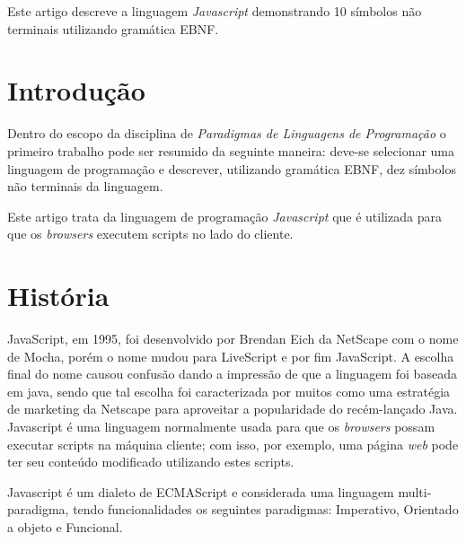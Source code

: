 \documentclass[
	article,			%
	11pt,				%
	oneside,			%
	a4paper,			%
	english,			%
	brazil,				%
	]{abntex2}
\begin{document}
\frenchspacing 

\maketitle

\begin{resumoumacoluna}
    
    Este artigo descreve a linguagem \emph{Javascript} demonstrando 10 símbolos
    não terminais utilizando gramática EBNF. 

 \vspace{\onelineskip}
 
 \noindent
\end{resumoumacoluna}

\textual

    \section*{Introdução}

        Dentro do escopo da disciplina de \emph{Paradigmas de Linguagens de Programação} o primeiro trabalho pode ser resumido da seguinte maneira: deve-se selecionar uma linguagem de programação e descrever, utilizando gramática EBNF, dez símbolos não terminais da linguagem. 
        
        Este artigo trata da linguagem de programação \emph{Javascript} que é utilizada para que os \emph{browsers} executem scripts no lado do cliente.

    \section{História}

        JavaScript, em 1995, foi desenvolvido por Brendan Eich da NetScape com o nome de Mocha, porém o nome mudou para LiveScript e por fim JavaScript.  A escolha final do nome causou confusão dando a impressão de que a linguagem foi baseada em java, sendo que tal escolha foi caracterizada por muitos como uma estratégia de marketing da Netscape para aproveitar a popularidade do recém-lançado Java. Javascript é uma linguagem normalmente usada para que os \emph{browsers} possam executar scripts na máquina cliente; com isso, por exemplo, uma página \emph{web} pode ter seu conteúdo modificado utilizando estes scripts. 
    
        Javascript é um dialeto de ECMAScript e considerada uma linguagem multi-paradigma, tendo funcionalidades os seguintes paradigmas: Imperativo, Orientado a objeto e Funcional.
   
\end{document}
